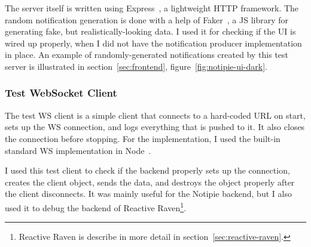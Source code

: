 The server itself is written
using Express~\cite{holowaychuck_express_2022},
a lightweight HTTP framework.
The random notification generation
is done with a help of Faker~\cite{marak_faker_2022},
a JS library for generating fake,
but realistically-looking data.
I used it for checking if the UI
is wired up properly,
when I did not have
the notification producer
implementation in place.
An example of randomly-generated notifications
created by this test server is illustrated
in section~\ref{sec:frontend},
figure~\ref{fig:notipie-ui-dark}.

\subsubsection{Test WebSocket Client}\label{sec:test-ws-client}

The test WS client
is a simple client that connects
to a hard-coded URL on start,
sets up the WS connection,
and logs everything that is pushed to it.
It also closes the connection before stopping.
For the implementation,
I used the built-in standard WS implementation
in Node~\cite{trott_node_2022}.

I used this test client
to check if the backend properly
sets up the connection,
creates the client object,
sends the data,
and destroys the object properly
after the client disconnects.
It was mainly useful for the Notipie backend,
but I also used it to debug the backend
of Reactive Raven\footnote{
  Reactive Raven is describe in more detail in section~\ref{sec:reactive-raven}.
}.

